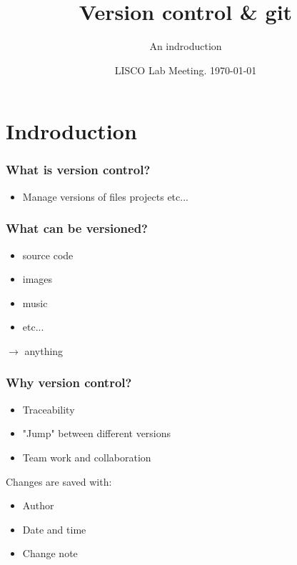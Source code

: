 \documentclass[aspectratio=169]{beamer}
\title{Version control \& git}
\subtitle{An indroduction}
\date{LISCO Lab Meeting. \today}
\begin{document}
\maketitle

\section{Indroduction}


\begin{frame}
\frametitle{What is version control?}

\begin{itemize}
	\item Manage versions of files projects etc...
\end{itemize}

\end{frame}


\begin{frame}
\frametitle{What can be versioned?}

\begin{itemize}
	\item source code
	\item images
	\item music
	\item etc...
\end{itemize}
$\rightarrow$ anything
\end{frame}


\begin{frame}
\frametitle{Why version control?}

\begin{itemize}
	\item Traceability
	\item "Jump" between different versions
	\item Team work and collaboration
\end{itemize}
\vspace{.5cm}
Changes are saved with:
\begin{itemize}
	\item Author
	\item Date and time
	\item Change note
\end{itemize}

\end{frame}
\end{document}
